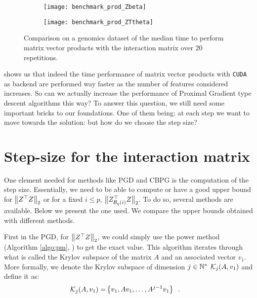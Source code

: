 \documentclass[../main.tex]{subfiles}
\begin{document}
\begin{figure}[ht]
	\begin{subfigure}{.45\textwidth}
		\centering
		\texttt{[image: benchmark\_prod\_Zbeta]}
	\end{subfigure} \hfill
	\begin{subfigure}{.45\textwidth}
		\centering
		\texttt{[image: benchmark\_prod\_ZTtheta]}
	\end{subfigure}
	\caption{
	Comparison on a genomics dataset of the median time to perform matrix
	vector products with the interaction matrix over $20$ repetitions.}
	\label{fig:matprod}
\end{figure}

 shows us that indeed the time performance of matrix vector
products with \texttt{CUDA} as backend are performed way faster as the number
of features considered increases.
So can we actually increase the performance of Proximal Gradient type descent
algorithms this way? To answer this question, we still need some important
bricks to our foundations.
One of them being: at each step we want to move towards the solution:
but how do we choose the step size?

\section{Step-size for the interaction matrix}\label{sec:step_size}

One element needed for methods like PGD and CBPG is the computation of the step
size.
Essentially, we need to be able to compute or have a good upper bound for
$\left \lVert Z^\top Z \right \rVert_2$ or for a fixed $i\leq p$,
$\big \lVert Z_{\mathcal{B}_{q}(i)}^\top Z \big \rVert_2$.
To do so, several methods are available.
Below we present the one used.
We compare the upper bounds obtained with different methods.

\medskip

First in the PGD, for $\left \lVert Z^\top Z \right \rVert_2$, we could simply use the power method
(Algorithm \ref{algo:pm}, \cite{golub2000eigenvalue}) to get the exact value.
This algorithm iterates through what is called the Krylov subspace of the
matrix $A$ and an associated vector $v_1$.
More formally, we denote the Krylov subspace of dimension $j\in\mathbb{N}^*$ $\mathcal{K}_j(A, v_1)$
and define it as:
\begin{align*}
	\cK_j(A, v_1) = \span \left\{v_1, Av_1,\dots, A^{j-1}v_1\right\}
	\enspace.
\end{align*}
\end{document}
